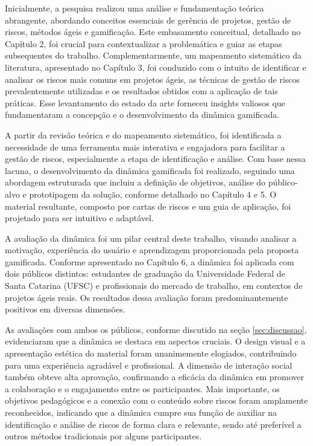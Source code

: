 \documentclass[
	12pt,
	openright,
	twoside,
	a4paper,
	english,
	brazil
	]{abntex2}
\begin{document}
Inicialmente, a pesquisa realizou uma análise e fundamentação teórica abrangente, abordando conceitos essenciais de gerência de projetos, gestão de riscos, métodos ágeis e gamificação. Este embasamento conceitual, detalhado no Capítulo 2, foi crucial para contextualizar a problemática e guiar as etapas subsequentes do trabalho. Complementarmente, um mapeamento sistemático da literatura, apresentado no Capítulo 3, foi conduzido com o intuito de identificar e analisar os riscos mais comuns em projetos ágeis, as técnicas de gestão de riscos prevalentemente utilizadas e os resultados obtidos com a aplicação de tais práticas. Esse levantamento do estado da arte forneceu insights valiosos que fundamentaram a concepção e o desenvolvimento da dinâmica gamificada.

A partir da revisão teórica e do mapeamento sistemático, foi identificada a necessidade de uma ferramenta mais interativa e engajadora para facilitar a gestão de riscos, especialmente a etapa de identificação e análise. Com base nessa lacuna, o desenvolvimento da dinâmica gamificada foi realizado, seguindo uma abordagem estruturada que incluiu a definição de objetivos, análise do público-alvo e prototipagem da solução, conforme detalhado no Capítulo 4 e 5. O material resultante, composto por cartas de riscos e um guia de aplicação, foi projetado para ser intuitivo e adaptável.

A avaliação da dinâmica foi um pilar central deste trabalho, visando analisar a motivação, experiência do usuário e aprendizagem proporcionada pela proposta gamificada. Conforme apresentado no Capítulo 6, a dinâmica foi aplicada com dois públicos distintos: estudantes de graduação da Universidade Federal de Santa Catarina (UFSC) e profissionais do mercado de trabalho, em contextos de projetos ágeis reais. Os resultados dessa avaliação foram predominantemente positivos em diversas dimensões.

As avaliações com ambos os públicos, conforme discutido na seção \ref{sec:discussao}, evidenciaram que a dinâmica se destaca em aspectos cruciais. O design visual e a apresentação estética do material foram unanimemente elogiados, contribuindo para uma experiência agradável e profissional. A dimensão de interação social também obteve alta aprovação, confirmando a eficácia da dinâmica em promover a colaboração e o engajamento entre os participantes. Mais importante, os objetivos pedagógicos e a conexão com o conteúdo sobre riscos foram amplamente reconhecidos, indicando que a dinâmica cumpre sua função de auxiliar na identificação e análise de riscos de forma clara e relevante, sendo até preferível a outros métodos tradicionais por alguns participantes.
\end{document}
